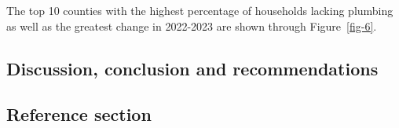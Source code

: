 \documentclass[
  letterpaper,
  DIV=11,
  numbers=noendperiod]{scrartcl}
\begin{document}
The top 10 counties with the highest percentage of households lacking
plumbing as well as the greatest change in 2022-2023 are shown through
Figure~\ref{fig-6}.

\subsection{Discussion, conclusion and
recommendations}\label{discussion-conclusion-and-recommendations}

\subsection{Reference section}\label{reference-section}
\end{document}
